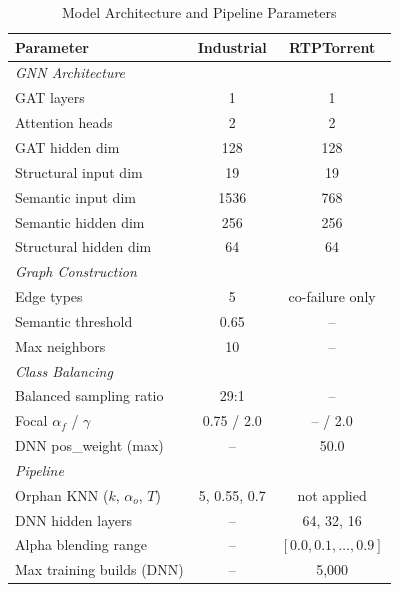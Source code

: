 \documentclass[10pt,journal,compsoc]{IEEEtran}
\begin{document}
\begin{table}[!t]
\centering
\caption{Model Architecture and Pipeline Parameters}
\label{tab:arch_params}
\footnotesize
\begin{tabular}{lcc}
\toprule
\textbf{Parameter} & \textbf{Industrial} & \textbf{RTPTorrent} \\
\midrule
\multicolumn{3}{l}{\textit{GNN Architecture}} \\
GAT layers & 1 & 1 \\
Attention heads & 2 & 2 \\
GAT hidden dim & 128 & 128 \\
Structural input dim & 19 & 19 \\
Semantic input dim & 1536 & 768 \\
Semantic hidden dim & 256 & 256 \\
Structural hidden dim & 64 & 64 \\
\midrule
\multicolumn{3}{l}{\textit{Graph Construction}} \\
Edge types & 5 & co-failure only \\
Semantic threshold & 0.65 & -- \\
Max neighbors & 10 & -- \\
\midrule
\multicolumn{3}{l}{\textit{Class Balancing}} \\
Balanced sampling ratio & 29:1 & -- \\
Focal $\alpha_f$ / $\gamma$ & 0.75 / 2.0 & -- / 2.0 \\
DNN pos\_weight (max) & -- & 50.0 \\
\midrule
\multicolumn{3}{l}{\textit{Pipeline}} \\
Orphan KNN ($k$, $\alpha_o$, $T$) & 5, 0.55, 0.7 & not applied \\
DNN hidden layers & -- & 64, 32, 16 \\
Alpha blending range & -- & $[0.0, 0.1, \ldots, 0.9]$ \\
Max training builds (DNN) & -- & 5,000 \\
\bottomrule
\end{tabular}
\end{table}
\end{document}
